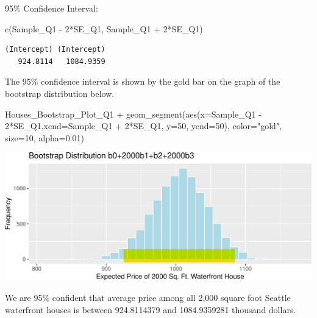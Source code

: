 \documentclass[
  letterpaper,
  DIV=11,
  numbers=noendperiod]{scrreprt}
\newenvironment{Shaded}{\begin{snugshade}}{\end{snugshade}}
\newcommand{\AttributeTok}[1]{\textcolor[rgb]{0.40,0.45,0.13}{#1}}
\newcommand{\DecValTok}[1]{\textcolor[rgb]{0.68,0.00,0.00}{#1}}
\newcommand{\FloatTok}[1]{\textcolor[rgb]{0.68,0.00,0.00}{#1}}
\newcommand{\FunctionTok}[1]{\textcolor[rgb]{0.28,0.35,0.67}{#1}}
\newcommand{\NormalTok}[1]{\textcolor[rgb]{0.00,0.23,0.31}{#1}}
\newcommand{\SpecialCharTok}[1]{\textcolor[rgb]{0.37,0.37,0.37}{#1}}
\newcommand{\StringTok}[1]{\textcolor[rgb]{0.13,0.47,0.30}{#1}}
\begin{document}
95\% Confidence Interval:

\begin{Shaded}
\begin{Highlighting}[]
\FunctionTok{c}\NormalTok{(Sample\_Q1 }\SpecialCharTok{{-}} \DecValTok{2}\SpecialCharTok{*}\NormalTok{SE\_Q1, Sample\_Q1 }\SpecialCharTok{+} \DecValTok{2}\SpecialCharTok{*}\NormalTok{SE\_Q1) }
\end{Highlighting}
\end{Shaded}

\begin{verbatim}
(Intercept) (Intercept) 
   924.8114   1084.9359 
\end{verbatim}

The 95\% confidence interval is shown by the gold bar on the graph of
the bootstrap distribution below.

\begin{Shaded}
\begin{Highlighting}[]
\NormalTok{Houses\_Bootstrap\_Plot\_Q1 }\SpecialCharTok{+} 
  \FunctionTok{geom\_segment}\NormalTok{(}\FunctionTok{aes}\NormalTok{(}\AttributeTok{x=}\NormalTok{Sample\_Q1 }\SpecialCharTok{{-}} \DecValTok{2}\SpecialCharTok{*}\NormalTok{SE\_Q1,}\AttributeTok{xend=}\NormalTok{Sample\_Q1 }\SpecialCharTok{+} \DecValTok{2}\SpecialCharTok{*}\NormalTok{SE\_Q1, }\AttributeTok{y=}\DecValTok{50}\NormalTok{, }\AttributeTok{yend=}\DecValTok{50}\NormalTok{), }
               \AttributeTok{color=}\StringTok{"gold"}\NormalTok{, }\AttributeTok{size=}\DecValTok{10}\NormalTok{, }\AttributeTok{alpha=}\FloatTok{0.01}\NormalTok{) }
\end{Highlighting}
\end{Shaded}

\includegraphics{Ch3_files/figure-pdf/unnamed-chunk-163-1.pdf}

We are 95\% confident that average price among all 2,000 square foot
Seattle waterfront houses is between 924.8114379 and 1084.9359281
thousand dollars.
\end{document}
